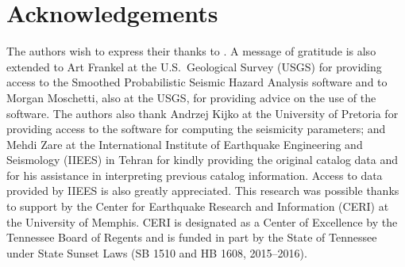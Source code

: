 \section{Acknowledgements}

The authors wish to express their thanks to . A message of gratitude is also extended to Art Fran\-kel at the U.S.~Geological Survey (USGS) for providing access to the Smoothed Probabilistic Seismic Hazard Analysis software and to Morgan Moschetti, also at the USGS, for providing advice on the use of the software. The authors also thank Andrzej Kijko at the University of Pretoria for providing access to the software for computing the seismicity parameters; and Mehdi Zare at the International Institute of Earthquake Engineering and Seismology (IIEES) in Tehran for kindly providing the original catalog data and for his assistance in interpreting previous catalog information. Access to data provided by IIEES is also greatly appreciated. This research was possible thanks to support by the Center for Earthquake Research and Information (CERI) at the University of Memphis. CERI is designated as a Center of Excellence by the Tennessee Board of Regents and is funded in part by the State of Tennessee under State Sunset Laws (SB 1510 and HB 1608, 2015--2016).
